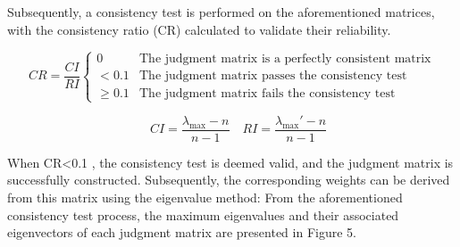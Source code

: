 \documentclass{mcmthesis}
\begin{document}
Subsequently, a consistency test is performed on the aforementioned matrices, 
with the consistency ratio (CR) calculated to validate their reliability. %

\begin{equation} \label{eq:CR} %
CR=\frac{CI}{RI}\left\{
\begin{array}{ll}
0 & \text{The judgment matrix is a perfectly consistent matrix} \\
<0.1 & \text{The judgment matrix passes the consistency test} \\
\geq 0.1 & \text{The judgment matrix fails the consistency test}
\end{array}
\right.
\end{equation}

\vspace{10pt}

\begin{equation} \label{eq:CI_RI} %
\quad CI=\frac{\lambda_{\max}-n}{n-1} \quad RI=\frac{\lambda_{\max}'-n}{n-1}
\end{equation}

When 
CR<0.1
, the consistency test is deemed valid, and the judgment matrix is successfully constructed. 
Subsequently, the corresponding weights can be derived from this matrix using the eigenvalue method:
From the aforementioned consistency test process, the maximum eigenvalues and their associated eigenvectors of
each judgment matrix are presented in Figure 5.
\end{document}
